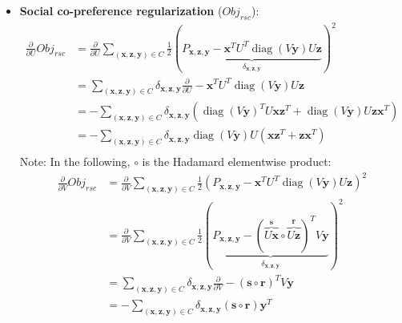 \documentclass{sig-alternate}
\newcommand{\Obj}{\mathit{Obj}}
\newcommand{\rsc}{\mathit{rsc}}
\newcommand{\tr}{\operatorname{tr}}
\newcommand{\diag}{\operatorname{diag}}
\newcommand{\x}{\vec{x}}
\newcommand{\y}{\vec{y}}
\newcommand{\z}{\vec{z}}
\renewcommand{\r}{\vec{r}}
\newcommand{\s}{\vec{s}}
\renewcommand{\vec}[1]{\mathbf{#1}}
\newcommand{\subfive}{\hspace{2.5mm}}
\begin{document}
\begin{itemize}
\item {\bf Social co-preference regularization} ($\Obj_\rsc$):
\begin{align*}
\frac{\partial}{\partial U} \Obj_\rsc & = \frac{\partial}{\partial U} \sum_{(\x,\z,\y) \in C} \frac{1}{2} \left( \underbrace{P_{\x,\z,\y} - \x^T U^T \diag(V\y) U \z}_{\delta_{\x,\z,\y}} \right)^2\\
& = \sum_{(\x,\z,\y) \in C} \delta_{\x,\z,\y} \frac{\partial}{\partial U} - \x^T U^T \diag(V\y) U \z \\
& = - \sum_{(\x,\z,\y) \in C} \delta_{\x,\z,\y} (\diag(V\y)^T U \x \z^T + \diag(V\y) U \z \x^T)\\ %
& = - \sum_{(\x,\z,\y) \in C} \delta_{\x,\z,\y} \diag(V\y) U (\x \z^T + \z \x^T)\\
\end{align*}
\subfive Note: In the following, $\circ$ is the Hadamard elementwise product:
\begin{align*}
\frac{\partial}{\partial V} \Obj_\rsc & = \frac{\partial}{\partial V} \sum_{(\x,\z,\y) \in C} \frac{1}{2} (P_{\x,\z,\y} - \x^T U^T \diag(V\y) U \z)^2\\
 & = \frac{\partial}{\partial V} \sum_{(\x,\z,\y) \in C} \frac{1}{2} \left( \underbrace{P_{\x,\z,\y} -  (\overbrace{U\x}^\s \circ \overbrace{U\z}^\r)^T V\y}_{\delta_{\x,\z,\y}} \right)^2\\
 & = \sum_{(\x,\z,\y) \in C} \delta_{\x,\z,\y} \frac{\partial}{\partial V} - (\s \circ \r)^T V\y\\
 & = - \sum_{(\x,\z,\y) \in C} \delta_{\x,\z,\y} (\s \circ \r) \y^T
\end{align*}


\end{itemize}
\end{document}
